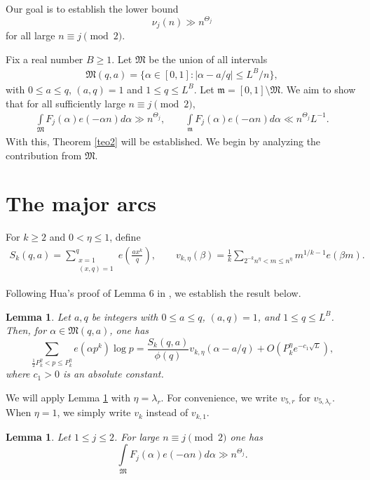 \documentclass{article}
\theoremstyle{plain}
\newtheorem{lemma}[theorem]{Lemma}
\begin{document}
Our goal is to establish the lower bound
$$\nu_j(n) \gg n^{\Theta_j}$$
for all large $n\equiv j \pmod 2$.

 Fix a real number $B \geq 1$. Let $\mathfrak{M}$ be the union of all intervals 
\begin{align}\label{mqamajor}
    \mathfrak{M}(q,a) = \{\alpha \in[0,1]: |\alpha - a/q| \leq L^B/n \},
\end{align} 
with $0\leq a \leq q$, $(a,q)=1$ and $1\leq q \leq L^B$. Let $\mathfrak{m} = [0,1]\setminus \mathfrak{M}$. We aim to show that for all sufficiently large $n\equiv j \pmod 2$, 
\begin{align}\label{task}
    \int \limits_{\mathfrak{M}} F_j(\alpha)e(-\alpha n)d\alpha \gg n^{\Theta_j}, \qquad \int \limits_{\mathfrak{m}} F_j(\alpha)e(-\alpha n)d\alpha \ll n^{\Theta_j}L^{-1}.
\end{align}
With this, Theorem \ref{teo2} will be established. We begin by analyzing the contribution from $\mathfrak{M}$.


\section{The major arcs}

For $k \geq 2$ and $0<\eta\leq 1$, define 
\begin{align*}
    S_k(q,a) = \sum \limits_{\substack{x=1 \\ (x,q)=1}}^{q} e\left(\frac{ax^k}{q} \right), \qquad v_{k,\eta}(\beta) = \frac{1}{k}\sum \limits_{2^{-k}n^{\eta}< m \leq n^{\eta}} m^{1/k - 1} e(\beta m).
\end{align*}

Following Hua’s proof of Lemma 6 in \cite{Hua38}, we establish the result below.

\begin{lemma}\label{hua6}
    Let $a,q$ be integers with $0\leq a \leq q$, $(a,q)=1$, and $1\leq q \leq L^B$. Then, for $\alpha \in \mathfrak{M}(q,a)$, one has 
    $$ \sum \limits_{\frac{1}{2}P_k^{\eta} < p \leq P_k^{\eta}} e(\alpha p^k)\log p = \frac{S_k(q,a)}{\phi(q)}v_{k,\eta}(\alpha -a/q) + O(P_k^{\eta}e^{-c_1\sqrt{L}}),$$
    where $c_1>0$ is an absolute constant.
\end{lemma}

We will apply Lemma \ref{hua6} with $\eta=\lambda_r$. For convenience, we write $v_{5,r}$ for $v_{5,\lambda_r}$. When $\eta=1$, we simply write $v_k$ instead of $v_{k,1}$.


\begin{lemma}\label{major}
    Let $1\leq j\leq 2$. For large $n\equiv j \pmod 2$ one has 
    $$ \int \limits_{\mathfrak{M}} F_j(\alpha)e(-\alpha n)d\alpha \gg n^{\Theta_j}.$$
\end{lemma}
\end{document}
